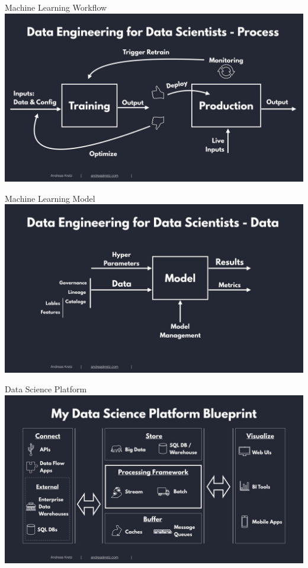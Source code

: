 \documentclass[xcolor=x11names,compress, 24pt]{beamer}
\renewcommand{\(}{\begin{columns}}
\renewcommand{\)}{\end{columns}}
\newcommand{\<}[1]{\begin{column}{#1}}
\renewcommand{\>}{\end{column}}
\begin{document}
\begin{frame}{Machine Learning Workflow}
	\includegraphics[scale=.25]{Machine-Learning-Workflow}
\end{frame}

\begin{frame}{Machine Learning Model}
	\includegraphics[scale=.25]{Machine-Learning-Model}
\end{frame}


\begin{frame}{Data Science Platform}
	\includegraphics[scale=.25]{Data-Science-Blueprint-New}
\end{frame}
\end{document}
